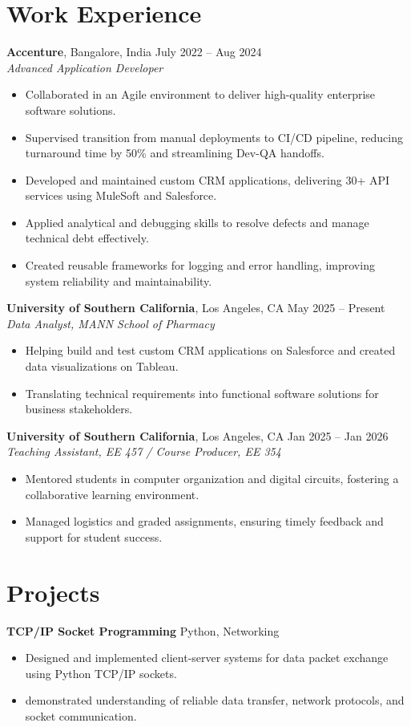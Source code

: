 \documentclass[letterpaper,10pt]{article}
\begin{document}
\section*{Work Experience}
\textbf{Accenture}, Bangalore, India \hfill July 2022 -- Aug 2024 \\
\textit{Advanced Application Developer}
\begin{itemize}
    \item Collaborated in an Agile environment to deliver high-quality enterprise software solutions.
    \item Supervised transition from manual deployments to CI/CD pipeline, reducing turnaround time by 50\% and streamlining Dev-QA handoffs.
    \item Developed and maintained custom CRM applications, delivering 30+ API services using MuleSoft and Salesforce.
    \item Applied analytical and debugging skills to resolve defects and manage technical debt effectively.
    \item Created reusable frameworks for logging and error handling, improving system reliability and maintainability.
\end{itemize}

\textbf{University of Southern California}, Los Angeles, CA \hfill May 2025 -- Present \\
\textit{Data Analyst, MANN School of Pharmacy}
\begin{itemize}
    \item Helping build and test custom CRM applications on Salesforce and created data visualizations on Tableau.
    \item Translating technical requirements into functional software solutions for business stakeholders.
\end{itemize}

\textbf{University of Southern California}, Los Angeles, CA \hfill Jan 2025 -- Jan 2026 \\
\textit{Teaching Assistant, EE 457 / Course Producer, EE 354}
\begin{itemize}
    \item Mentored students in computer organization and digital circuits, fostering a collaborative learning environment.
    \item Managed logistics and graded assignments, ensuring timely feedback and support for student success.
\end{itemize}

\section*{Projects}
\textbf{TCP/IP Socket Programming} \hfill Python, Networking \\
\begin{itemize}
    \item Designed and implemented client-server systems for data packet exchange using Python TCP/IP sockets.
    \item demonstrated understanding of reliable data transfer, network protocols, and socket communication.
\end{itemize}
\end{document}
